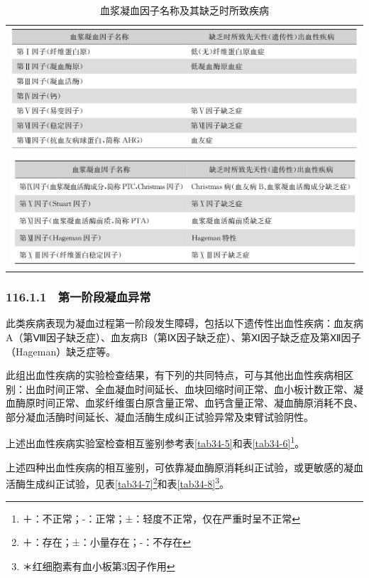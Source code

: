 \begin{longtable}{c}
 \caption{血浆凝血因子名称及其缺乏时所致疾病}
 \label{tab34-4}
 \endfirsthead
 \caption[]{血浆凝血因子名称及其缺乏时所致疾病}
 \endhead
 \includegraphics[width=\textwidth,height=\textheight,keepaspectratio]{./images/Image00198.jpg}\\
 \includegraphics[width=\textwidth,height=\textheight,keepaspectratio]{./images/Image00199.jpg}
 \end{longtable}

\subsubsection{116.1.1　第一阶段凝血异常}

此类疾病表现为凝血过程第一阶段发生障碍，包括以下遗传性出血性疾病：血友病A（第Ⅷ因子缺乏症）、血友病B（第Ⅸ因子缺乏症）、第Ⅺ因子缺乏症及第Ⅻ因子（Hageman）缺乏症等。

此组出血性疾病的实验检查结果，有下列的共同特点，可与其他出血性疾病相区别：出血时间正常、全血凝血时间延长、血块回缩时间正常、血小板计数正常、凝血酶原时间正常、血浆纤维蛋白原含量正常、血钙含量正常、凝血酶原消耗不良、部分凝血活酶时间延长、凝血活酶生成纠正试验异常及束臂试验阴性。

上述出血性疾病实验室检查相互鉴别参考表\ref{tab34-5}和表\ref{tab34-6}\footnote{＋：不正常；-：正常；±：轻度不正常，仅在严重时呈不正常}。

上述四种出血性疾病的相互鉴别，可依靠凝血酶原消耗纠正试验，或更敏感的凝血活酶生成纠正试验，见表\ref{tab34-7}\footnote{＋：存在；±：小量存在；-：不存在}和表\ref{tab34-8}\footnote{＊红细胞素有血小板第3因子作用}。

